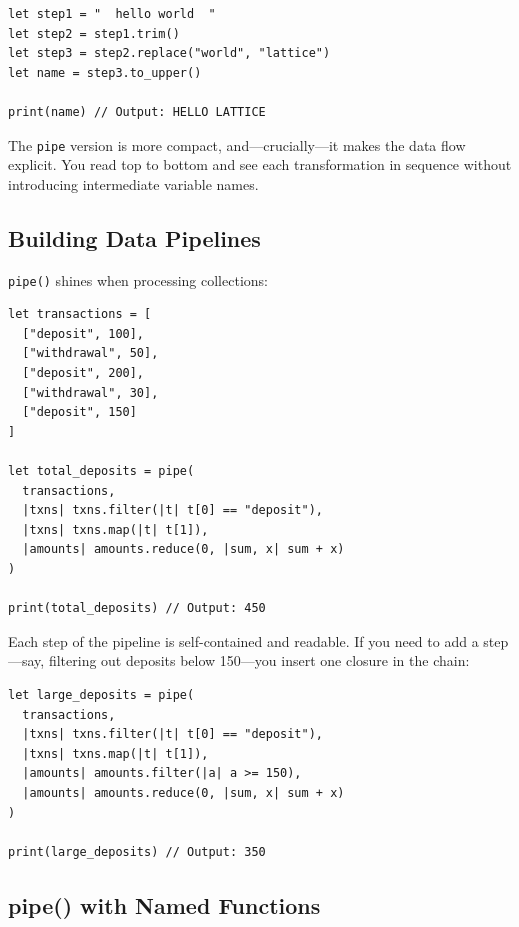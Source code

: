 \begin{lstlisting}[language=Lattice, caption={The same transformations without pipe}]
let step1 = "  hello world  "
let step2 = step1.trim()
let step3 = step2.replace("world", "lattice")
let name = step3.to_upper()

print(name) // Output: HELLO LATTICE
\end{lstlisting}

The \lstinline|pipe| version is more compact, and---crucially---it makes the data flow explicit. You read top to bottom and see each transformation in sequence without introducing intermediate variable names.

\subsection{Building Data Pipelines}\label{sec:data-pipelines}

\lstinline|pipe()| shines when processing collections:

\begin{lstlisting}[language=Lattice, caption={A data processing pipeline}]
let transactions = [
  ["deposit", 100],
  ["withdrawal", 50],
  ["deposit", 200],
  ["withdrawal", 30],
  ["deposit", 150]
]

let total_deposits = pipe(
  transactions,
  |txns| txns.filter(|t| t[0] == "deposit"),
  |txns| txns.map(|t| t[1]),
  |amounts| amounts.reduce(0, |sum, x| sum + x)
)

print(total_deposits) // Output: 450
\end{lstlisting}

Each step of the pipeline is self-contained and readable. If you need to add a step---say, filtering out deposits below 150---you insert one closure in the chain:

\begin{lstlisting}[language=Lattice, caption={Adding a step to the pipeline}]
let large_deposits = pipe(
  transactions,
  |txns| txns.filter(|t| t[0] == "deposit"),
  |txns| txns.map(|t| t[1]),
  |amounts| amounts.filter(|a| a >= 150),
  |amounts| amounts.reduce(0, |sum, x| sum + x)
)

print(large_deposits) // Output: 350
\end{lstlisting}

\subsection{pipe() with Named Functions}\label{sec:pipe-named-functions}

